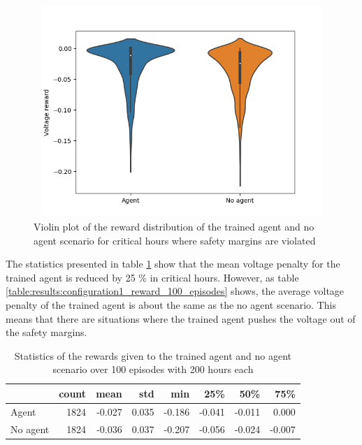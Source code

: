 \documentclass[class=book, crop=false]{standalone}
\begin{document}
\begin{figure}[H]
    \center
\includegraphics[height=8cm, width=12cm]{figures/config1_voltage_violin.png}
    \caption[size = 9]{Violin plot of the reward distribution of the trained agent and no agent scenario for critical hours where safety margins are violated}
    \label{fig:results:config1_voltage_violin}
\end{figure}

The statistics presented in table \ref{table:results:configuration1_reward_100_ep_preventive} show that the mean voltage penalty for the trained agent is reduced by 25 \% in critical hours. However, as table
\ref{table:results:configuration1_reward_100_episodes} shows, the average voltage penalty of the trained agent is about the same as the no agent scenario. This means that there are situations where the trained agent pushes the voltage out of the safety margins.    


\begin{table}[ht]
\center
\begin{tabular}{l|rrrrrrr}
         & count & mean   & std   & min    & 25\%   & 50\%   & 75\%   \\
\hline
Agent    & 1824 & -0.027 & 0.035 & -0.186 & -0.041 & -0.011 & 0.000  \\
No agent & 1824 & -0.036 & 0.037 & -0.207 & -0.056 & -0.024 & -0.007 \\
\hline
\end{tabular}
\caption{Statistics of the rewards given to the trained agent and no agent scenario over 100 episodes with 200 hours each}
\label{table:results:configuration1_reward_100_ep_preventive}
\end{table}
\end{document}
